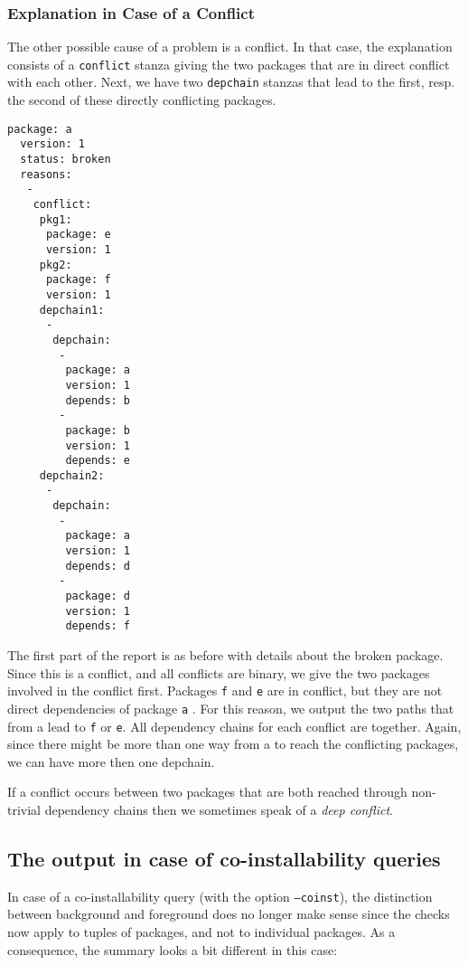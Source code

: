 \subsubsection{Explanation in Case of a Conflict}
The other possible cause of a problem is a conflict. In that case, the
explanation consists of a \texttt{conflict} stanza giving the two
packages that are in direct conflict with each other. Next, we have
two \texttt{depchain} stanzas that lead to the first, resp. the second
of these directly conflicting packages.
\begin{example}
\begin{verbatim}
package: a
  version: 1
  status: broken
  reasons:
   -
    conflict:
     pkg1:
      package: e
      version: 1
     pkg2:
      package: f
      version: 1
     depchain1:
      -
       depchain:
        -
         package: a
         version: 1
         depends: b
        -
         package: b
         version: 1
         depends: e
     depchain2:
      -
       depchain:
        -
         package: a
         version: 1
         depends: d
        -
         package: d
         version: 1
         depends: f
\end{verbatim}
The first part of the \debcheck{} report is as before with details
about the broken package. Since this is a conflict, and all conflicts
are binary, we give the two packages involved in the conflict
first. Packages \texttt{f} and \texttt{e} are in conflict, but they
are not direct dependencies of package \texttt{a} . For this reason,
we output the two paths that from a lead to \texttt{f} or
\texttt{e}. All dependency chains for each conflict are
together. Again, since there might be more than one way from a to
reach the conflicting packages, we can have more then one depchain.
\end{example}
If a conflict occurs between two packages that are both reached
through non-trivial dependency chains then we sometimes speak of a
\emph{deep conflict}.

\subsection{The output in case of co-installability queries}
In case of a co-installability query (with the option
\texttt{--coinst}), the distinction between background and foreground
does no longer make sense since the checks now apply to tuples of packages,
and not to individual packages. As a consequence, the summary looks a bit
different in this case:

